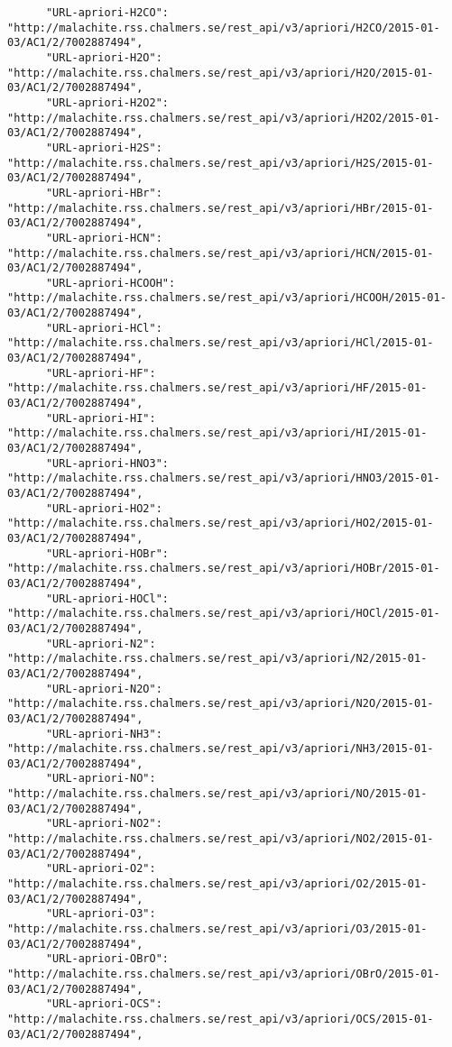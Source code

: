 \begin{enumerate}
\begin{tiny}
\begin{verbatim}
      "URL-apriori-H2CO": "http://malachite.rss.chalmers.se/rest_api/v3/apriori/H2CO/2015-01-03/AC1/2/7002887494", 
      "URL-apriori-H2O": "http://malachite.rss.chalmers.se/rest_api/v3/apriori/H2O/2015-01-03/AC1/2/7002887494", 
      "URL-apriori-H2O2": "http://malachite.rss.chalmers.se/rest_api/v3/apriori/H2O2/2015-01-03/AC1/2/7002887494", 
      "URL-apriori-H2S": "http://malachite.rss.chalmers.se/rest_api/v3/apriori/H2S/2015-01-03/AC1/2/7002887494", 
      "URL-apriori-HBr": "http://malachite.rss.chalmers.se/rest_api/v3/apriori/HBr/2015-01-03/AC1/2/7002887494", 
      "URL-apriori-HCN": "http://malachite.rss.chalmers.se/rest_api/v3/apriori/HCN/2015-01-03/AC1/2/7002887494", 
      "URL-apriori-HCOOH": "http://malachite.rss.chalmers.se/rest_api/v3/apriori/HCOOH/2015-01-03/AC1/2/7002887494", 
      "URL-apriori-HCl": "http://malachite.rss.chalmers.se/rest_api/v3/apriori/HCl/2015-01-03/AC1/2/7002887494", 
      "URL-apriori-HF": "http://malachite.rss.chalmers.se/rest_api/v3/apriori/HF/2015-01-03/AC1/2/7002887494", 
      "URL-apriori-HI": "http://malachite.rss.chalmers.se/rest_api/v3/apriori/HI/2015-01-03/AC1/2/7002887494", 
      "URL-apriori-HNO3": "http://malachite.rss.chalmers.se/rest_api/v3/apriori/HNO3/2015-01-03/AC1/2/7002887494", 
      "URL-apriori-HO2": "http://malachite.rss.chalmers.se/rest_api/v3/apriori/HO2/2015-01-03/AC1/2/7002887494", 
      "URL-apriori-HOBr": "http://malachite.rss.chalmers.se/rest_api/v3/apriori/HOBr/2015-01-03/AC1/2/7002887494", 
      "URL-apriori-HOCl": "http://malachite.rss.chalmers.se/rest_api/v3/apriori/HOCl/2015-01-03/AC1/2/7002887494", 
      "URL-apriori-N2": "http://malachite.rss.chalmers.se/rest_api/v3/apriori/N2/2015-01-03/AC1/2/7002887494", 
      "URL-apriori-N2O": "http://malachite.rss.chalmers.se/rest_api/v3/apriori/N2O/2015-01-03/AC1/2/7002887494", 
      "URL-apriori-NH3": "http://malachite.rss.chalmers.se/rest_api/v3/apriori/NH3/2015-01-03/AC1/2/7002887494", 
      "URL-apriori-NO": "http://malachite.rss.chalmers.se/rest_api/v3/apriori/NO/2015-01-03/AC1/2/7002887494", 
      "URL-apriori-NO2": "http://malachite.rss.chalmers.se/rest_api/v3/apriori/NO2/2015-01-03/AC1/2/7002887494", 
      "URL-apriori-O2": "http://malachite.rss.chalmers.se/rest_api/v3/apriori/O2/2015-01-03/AC1/2/7002887494", 
      "URL-apriori-O3": "http://malachite.rss.chalmers.se/rest_api/v3/apriori/O3/2015-01-03/AC1/2/7002887494", 
      "URL-apriori-OBrO": "http://malachite.rss.chalmers.se/rest_api/v3/apriori/OBrO/2015-01-03/AC1/2/7002887494", 
      "URL-apriori-OCS": "http://malachite.rss.chalmers.se/rest_api/v3/apriori/OCS/2015-01-03/AC1/2/7002887494", 

\end{verbatim}
\end{tiny}
\end{enumerate}
